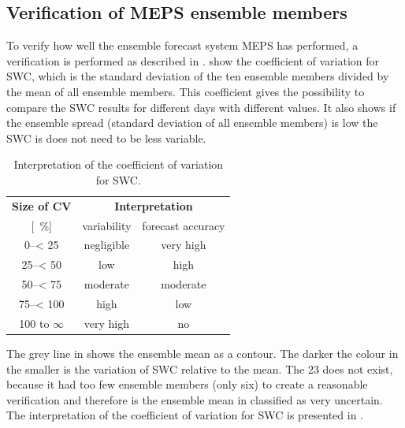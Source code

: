 \subsection{Verification of MEPS ensemble members}\label{sec:variation}

To verify how well the ensemble forecast system MEPS has performed, a verification is performed as described in .  show the coefficient of variation for SWC, which is the standard deviation of the ten ensemble members divided by the mean of all ensemble members. This coefficient gives the possibility to compare the SWC results for different days with different values. It also shows if the ensemble spread (standard deviation of all ensemble members) is low the SWC is does not need to be less variable.
\begin{table}[t!]
	\begin{center}
		\caption{Interpretation of the coefficient of variation for SWC.} \label{tab:verification}
		\begin{tabular}{lc|c|c}
			\hline\hline
			\multicolumn{2}{c|}{\textbf{Size of CV}} & \multicolumn{2}{c}{\textbf{Interpretation}} \\ 
			\multicolumn{2}{c|}{[\SI{}{\percent}]} & variability & forecast accuracy \\ \hline \hline 
			\multicolumn{2}{c|}{\numrange{0}{< 25}} & negligible & very high  \\ \hline
			\multicolumn{2}{c|}{\numrange{25}{< 50}} & low & high \\ \hline
			\multicolumn{2}{c|}{\numrange{50}{< 75}} & moderate & moderate \\ \hline
			\multicolumn{2}{c|}{\numrange{75}{< 100}} & high & low \\ \hline
			\multicolumn{2}{c|}{\num{100} to $\infty$} & very high & no  \\ \hline \hline
		\end{tabular}
	\end{center}
\end{table}
% 
The grey line in  shows the ensemble mean as a contour. The darker the colour in  the smaller is the variation of SWC relative to the mean. The \SI{23}{\dec} does not exist, because it had too few ensemble members (only six) to create a reasonable verification and therefore is the ensemble mean in  classified as very uncertain. The interpretation of the coefficient of variation for SWC is presented in .
